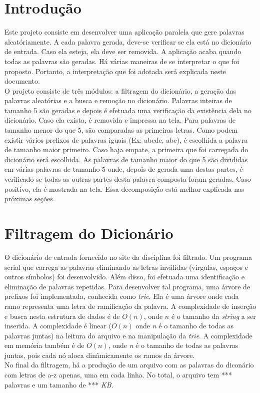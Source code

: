 \documentclass[a4paper]{article}
\begin{document}
\section{Introdução}
\indent \indent Este projeto consiste em desenvolver uma aplicação paralela que gere palavras aleatóriamente. A cada palavra gerada, deve-se verificar se ela está no dicionário de entrada. Caso ela esteja, ela deve ser removida. A aplicação acaba quando todas as palavras são geradas. Há várias maneiras de se interpretar o que foi proposto. Portanto, a interpretação que foi adotada será explicada neste documento.\\
\indent O projeto consiste de três módulos: a filtragem do dicionário, a geração das palavras aleatórias e a busca e remoção no dicionário. Palavras inteiras de tamanho 5 são geradas e depois é efetuada uma verificação da existência dela no dicionário. Caso ela exista, é removida e impressa na tela. Para palavras de tamanho menor do que 5, são comparadas as primeiras letras. Como podem existir vários prefixos de palavras iguais (Ex: abcde, abc), é escolhida a palavra de tamanho maior primeiro. Caso haja empate, a primeira que foi carregada do dicionário será escolhida. As palavras de tamanho maior do que 5 são divididas em várias palavras de tamanho 5 onde, depois de gerada uma destas partes, é verificado se todas as outras partes desta palavra composta foram geradas. Caso positivo, ela é mostrada na tela. Essa decomposição está melhor explicada nas próximas seções.

\section{Filtragem do Dicionário}
\indent \indent O dicionário de entrada fornecido no site da disciplina foi filtrado. Um programa serial que carrega as palavras eliminando as letras inválidas (vírgulas, espaços e outros símbolos) foi desenvolvido. Além disso, foi efetuada uma identificação e eliminação de palavras repetidas. Para desenvolver tal programa, uma árvore de prefixos foi implementada, conhecida como \emph{trie}. Ela é uma árvore onde cada ramo representa uma letra de ramificação da palavra. A complexidade de inserção e busca nesta estrutura de dados é de \begin{math}O(n)\end{math}, onde \begin{math}n\end{math} é o tamanho da \emph{string} a ser inserida. A complexidade é linear (\begin{math}O(n)\end{math} onde \emph{n} é o tamanho de todas as palavras juntas) na leitura do arquivo e na manipulação da \emph{trie}. A complexidade em memória também é de \begin{math}O(n)\end{math}, onde \emph{n} é o tamanho de todas as palavras juntas, pois cada nó aloca dinâmicamente os ramos da árvore.\\
\indent No final da filtragem, há a produção de um arquivo com as palavras do diconário com letras de a-z apenas, uma em cada linha. No total, o arquivo tem *** palavras e um tamanho de *** \emph{KB}.
\end{document}
